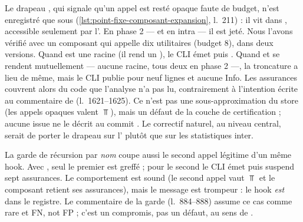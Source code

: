 \begin{piege}
Le drapeau , qui signale qu'un appel est resté opaque faute
de budget, n'est enregistré que sous 
(\cref{lst:point-fixe-composant-expansion}, l.~211) : il vit dans
, accessible seulement par l'. En
phase 2 --- et en intra --- il est jeté. Nous l'avons vérifié avec un
composant  qui appelle dix utilitaires 
(budget 8), dans deux versions. Quand  est une racine (il rend un
), le CLI émet
puis . Quand
 et  se rendent mutuellement --- aucune racine, tous deux en
phase 2 ---, la troncature a lieu de même, mais le CLI publie pour 
neuf lignes  et aucune Info. Les assurances couvrent alors
du code que l'analyse n'a pas lu, contrairement à l'intention écrite au
commentaire de  (l.~1621--1625). Ce n'est pas une
sous-approximation du store (les appels opaques valent $\Top$), mais un
défaut de la couche de certification ; aucune issue ne le décrit au commit
\snapshotCommit. Le correctif naturel, au niveau central, serait de porter le
drapeau sur l' plutôt que sur les statistiques inter.
\end{piege}

\begin{piege}
La garde de récursion par \emph{nom} coupe aussi le second appel légitime
d'un même hook. Avec ,
seul le premier est greffé ; pour le second le CLI émet
puis suspend sept assurances. Le comportement est sound (le second appel
vaut $\Top$ et le composant retient ses assurances), mais le message est
trompeur : le hook \emph{est} dans le registre. Le commentaire de la garde
(l.~884--888) assume ce cas comme \og rare\fg{} et \og FN, not FP\fg{} ;
c'est un compromis, pas un défaut, au sens de .
\end{piege}

